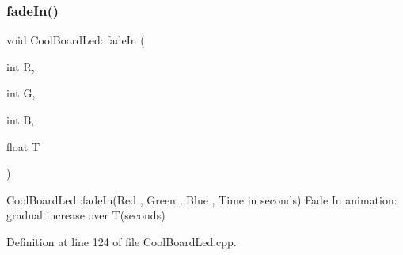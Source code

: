 \subsubsection{\texorpdfstring{fade\+In()}{fadeIn()}}
{\footnotesize\ttfamily void Cool\+Board\+Led\+::fade\+In (\begin{DoxyParamCaption}\item[{int}]{R,  }\item[{int}]{G,  }\item[{int}]{B,  }\item[{float}]{T }\end{DoxyParamCaption})}

Cool\+Board\+Led\+::fade\+In(\+Red , Green , Blue , Time in seconds) Fade In animation\+: gradual increase over T(seconds) 

Definition at line 124 of file Cool\+Board\+Led.\+cpp.


